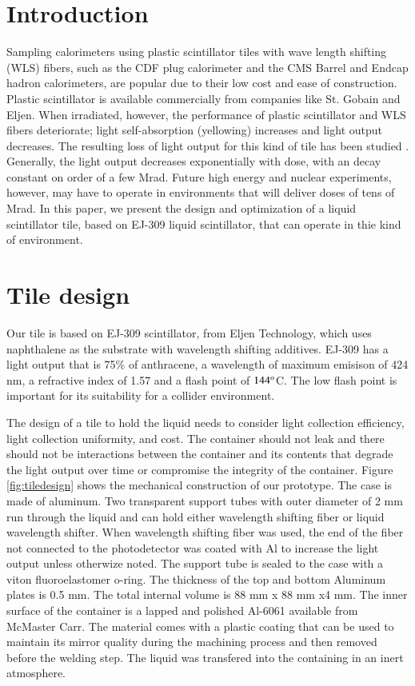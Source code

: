 \documentclass[review]{elsarticle}
\begin{document}
\linenumbers

\section{Introduction}
Sampling calorimeters using plastic scintillator tiles with wave length shifting (WLS) fibers, such as the CDF plug calorimeter \cite{Aota1995557}
and the CMS Barrel\cite{CMSHB} and Endcap\cite{HCALTDR1997} hadron calorimeters, are popular due to their low cost and ease of construction.  Plastic scintillator is available commercially from companies like St. Gobain and Eljen.  When irradiated, however, the performance of plastic scintillator and WLS fibers deteriorate; light self-absorption (yellowing) increases and light output decreases.  The resulting loss of light output for this kind of tile has been studied
\cite{vasken}\cite{ByonWagner1993263}.
Generally, the light output decreases exponentially with dose, with an decay constant on order of a few Mrad.  Future high energy and nuclear experiments, however, may have to operate in environments that will deliver doses of tens of Mrad.  In this paper, we present the design and optimization of a liquid scintillator tile, based on EJ-309 liquid scintillator, that can operate in thie kind of environment.


\section{Tile design}

Our tile is based on EJ-309 scintillator, from Eljen Technology, which uses naphthalene as the substrate with wavelength shifting additives.  EJ-309 has a light output that is 75\% of anthracene, a wavelength of maximum emisison of 424 nm, a refractive index of 1.57 and a flash point of $\rm{144^o}$C.  The low flash point is important for its suitability for a collider environment.

The design of a tile to hold the liquid needs to consider light collection efficiency, light collection uniformity, and cost.  The container should not leak and there should not be interactions between the container and its contents that degrade the light output over time or compromise the integrity
of the container.
Figure \ref{fig:tiledesign} shows the mechanical construction of our prototype.  The case is made of aluminum.  Two transparent support tubes with outer diameter of 2 mm run through the liquid and can hold either wavelength shifting fiber or liquid wavelength shifter.  When wavelength shifting fiber was used, the end of the fiber not connected to the photodetector was coated with Al to increase the light output unless otherwize noted.
The support tube is sealed to the case with a viton fluoroelastomer o-ring.  The thickness of the top and bottom Aluminum plates is 0.5 mm.  The total internal volume is 88 mm x 88 mm x4 mm. The inner surface of the container
is a lapped and polished Al-6061 available from McMaster Carr. The material comes with a plastic coating that can be 
used to maintain its mirror quality during the machining process and then removed before the welding step.  The liquid was transfered into the containing in an inert atmosphere.
\end{document}
